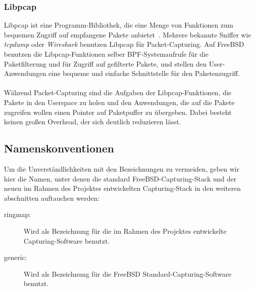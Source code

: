 \subsubsection{Libpcap}\label{sec:libpcap}
Libpcap ist eine Programm-Bibliothek, die eine Menge von Funktionen zum
bequemen Zugriff auf empfangene Pakete anbietet~\cite{man_pcap}. Mehrere
bekannte Sniffer wie \emph{tcpdump} oder \emph{Wireshark} benutzen Libpcap für
Packet-Capturing.  Auf FreeBSD benutzen die Libpcap-Funktionen  selber
BPF-Systemaufrufe für die Paketfilterung und für Zugriff auf gefilterte Pakete,
und stellen den User-Anwendungen eine bequeme und einfache Schnittstelle für
den Paketenzugriff.\\\\
%
Während Packet-Capturing sind die Aufgaben der Libpcap-Funktionen, die Pakete in den
Userspace zu holen und den Anwendungen, die auf die Pakete zugreifen wollen einen
Pointer auf Paketpuffer zu übergeben. Dabei besteht keinen großen Overhead, der 
sich deutlich reduzieren lässt.


\subsection{Namenskonventionen}
Um die Unverständlichkeiten mit den Bezeichnungen zu vermeiden, geben wir 
hier die Namen, unter denen die standard FreeBSD-Capturing-Stack und 
der neuen im Rahmen des Projektes entwickelten Capturing-Stack in den 
weiteren abschnitten auftauchen werden: 
\begin{description}
	\item[ringmap:] Wird als Bezeichnung für die im Rahmen des Projektes 
		entwickelte Capturing-Software benutzt. 
	\item [generic:] Wird als Bezeichnung für die FreeBSD Standard-Capturing-Software benutzt.
\end{description}

